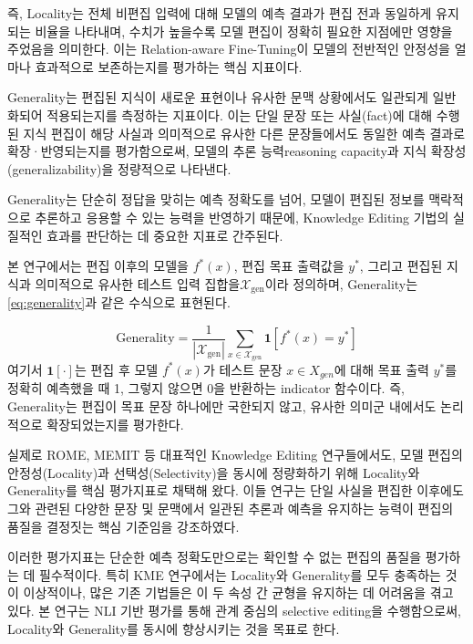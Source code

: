 \documentclass[a4paper,fleqn]{cas-sc}
\begin{document}
즉, Locality는 전체 비편집 입력에 대해 모델의 예측 결과가 편집 전과 동일하게 유지되는 비율을 나타내며, 수치가 높을수록 모델 편집이 정확히 필요한 지점에만 영향을 주었음을 의미한다. 이는 Relation-aware Fine-Tuning이 모델의 전반적인 안정성을 얼마나 효과적으로 보존하는지를 평가하는 핵심 지표이다.

Generality는 편집된 지식이 새로운 표현이나 유사한 문맥 상황에서도 일관되게 일반화되어 적용되는지를 측정하는 지표이다. 이는 단일 문장 또는 사실(fact)에 대해 수행된 지식 편집이 해당 사실과 의미적으로 유사한 다른 문장들에서도 동일한 예측 결과로 확장·반영되는지를 평가함으로써, 모델의 추론 능력reasoning capacity과 지식 확장성(generalizability)을 정량적으로 나타낸다.

Generality는 단순히 정답을 맞히는 예측 정확도를 넘어, 모델이 편집된 정보를 맥락적으로 추론하고 응용할 수 있는 능력을 반영하기 때문에, Knowledge Editing 기법의 실질적인 효과를 판단하는 데 중요한 지표로 간주된다.

본 연구에서는 편집 이후의 모델을 $f^*(x)$, 편집 목표 출력값을 $y^*$, 그리고 편집된 지식과 의미적으로 유사한 테스트 입력 집합을 ​\( \mathcal{X}_{\text{gen}} \)이라 정의하며, Generality는 \cref{eq:generality}과 같은 수식으로 표현된다.


\begin{equation}
\text{Generality} = \frac{1}{\left| \mathcal{X}_{\text{gen}} \right|} \sum_{x \in \mathcal{X}_{\text{gen}}} \mathbf{1} \left[ f^*(x) = y^* \right]
\label{eq:generality}
\end{equation}
\noindent
여기서 $\mathbf{1}[\cdot]$는 편집 후 모델 $f^*(x)$가 테스트 문장 $x \in X_{gen}$​에 대해 목표 출력 $y^*$를 정확히 예측했을 때 1, 그렇지 않으면 0을 반환하는 indicator 함수이다. 즉, Generality는 편집이 목표 문장 하나에만 국한되지 않고, 유사한 의미군 내에서도 논리적으로 확장되었는지를 평가한다.


실제로 ROME, MEMIT 등 대표적인 Knowledge Editing 연구들에서도, 모델 편집의 안정성(Locality)과 선택성(Selectivity)을 동시에 정량화하기 위해 Locality와 Generality를 핵심 평가지표로 채택해 왔다. 이들 연구는 단일 사실을 편집한 이후에도 그와 관련된 다양한 문장 및 문맥에서 일관된 추론과 예측을 유지하는 능력이 편집의 품질을 결정짓는 핵심 기준임을 강조하였다.

이러한 평가지표는 단순한 예측 정확도만으로는 확인할 수 없는 편집의 품질을 평가하는 데 필수적이다. 특히 KME 연구에서는 Locality와 Generality를 모두 충족하는 것이 이상적이나, 많은 기존 기법들은 이 두 속성 간 균형을 유지하는 데 어려움을 겪고 있다. 본 연구는 NLI 기반 평가를 통해 관계 중심의 selective editing을 수행함으로써, Locality와 Generality를 동시에 향상시키는 것을 목표로 한다.
\end{document}
